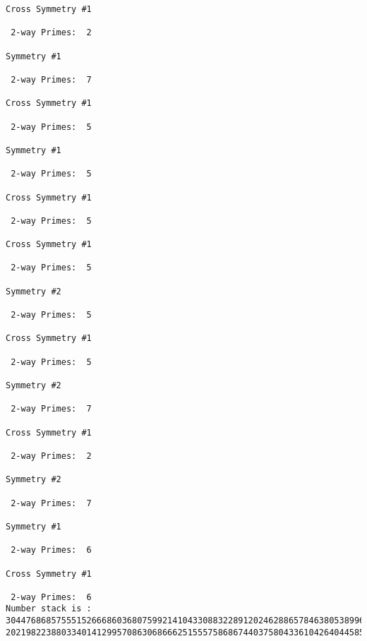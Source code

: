 \begin{verbatim}
Cross Symmetry #1

 2-way Primes: 	2

Symmetry #1

 2-way Primes: 	7

Cross Symmetry #1

 2-way Primes: 	5

Symmetry #1

 2-way Primes: 	5

Cross Symmetry #1

 2-way Primes: 	5

Cross Symmetry #1

 2-way Primes: 	5

Symmetry #2

 2-way Primes: 	5

Cross Symmetry #1

 2-way Primes: 	5

Symmetry #2

 2-way Primes: 	7

Cross Symmetry #1

 2-way Primes: 	2

Symmetry #2

 2-way Primes: 	7

Symmetry #1

 2-way Primes: 	6

Cross Symmetry #1

 2-way Primes: 	6
Number stack is :
30447686857555152666860368075992141043308832289120246288657846380538996794608835958544046240163340857
20219822388033401412995708630686662515557586867440375804336104264044585953880649769983508364875688264


\end{verbatim}
